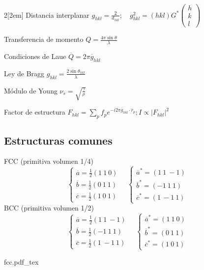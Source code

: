 \documentclass[leqno]{article}
\newcommand{\incfig}[1]{%
\begin{center}
\def\svgwidth{0.9\columnwidth}
{#1.pdf_tex}
\end{center}
}
\begin{document}
\begin{multicols}{2}[\columnsep2em]
Distancia interplanar $g_{hkl}= \frac{2}{d_{hkl}}; \quad g_{hkl}^2 = (hkl)G^*\begin{pmatrix} h\\k\\l \end{pmatrix}  $

Transferencia de momento $Q = \frac{4\pi \sin\theta }{\lambda}$

Condiciones de Laue $\overline{Q}=2\pi \overline{g}_{hkl}$

Ley de Bragg $g_{hkl} = \frac{2\sin \theta_{hkl}}{\lambda}$ 

Módulo de Young $\nu_s = \sqrt{\frac{\gamma}{\rho }} $

Factor de estructura $F_{hkl} = \sum_p f_p e^{-i2\pi \overline{g}_{hkl}\cdot \overline{r}_p}; I \propto |F_{hkl}|^2 $

\subsection{Estructuras comunes}

FCC (primitiva volumen 1/4)
\[
\begin{cases}
  \overline{a} = \frac{1}{2} (1\ 1\ 0) \\
  \overline{b} = \frac{1}{2} (0\ 1\ 1) \\
  \overline{c} = \frac{1}{2} (1\ 0\ 1)
\end{cases} \quad 
\begin{cases}
  \overline{a}^* = (1\ 1\ -1)\\
  \overline{b}^* = (-1\ 1\ 1 )\\
  \overline{c}^* = (1\ -1\ 1)
\end{cases} 
\]
BCC (primitiva volumen 1/2)
\[
\begin{cases}
  \overline{a} = \frac{1}{2} (1\ 1\ -1) \\
  \overline{b} = \frac{1}{2} (-1\ 1\ 1) \\
  \overline{c} = \frac{1}{2} (1\ -1\ 1)
\end{cases} \quad 
\begin{cases}
  \overline{a}^* = (1\ 1\ 0)\\
  \overline{b}^* = (0\ 1\ 1 )\\
  \overline{c}^* = (1\ 0\ 1)
\end{cases} 
\]
\begin{minipage}{\columnwidth}
\incfig{fcc}
\end{minipage}


\end{multicols}
\end{document}
